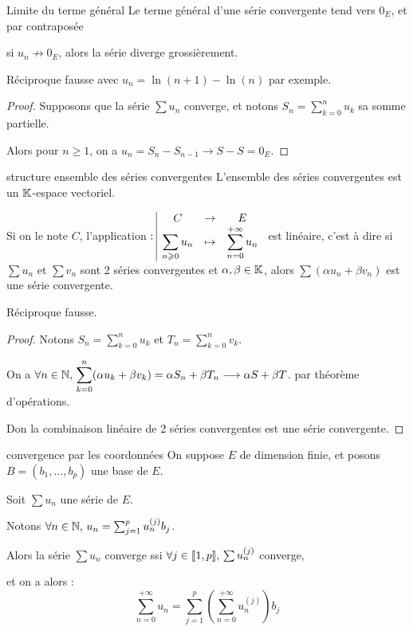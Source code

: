 \begin{theoreme}{Limite du terme général}{}
    Le terme général d'une série convergente tend vers $0_E$, et par contraposée 
    
    si $u_n \not \longrightarrow 0_E$, alors la série diverge grossièrement. 
\end{theoreme}

\begin{remarque}
    Réciproque fausse avec $u_n = \ln(n + 1) - \ln(n)$ par exemple. 
\end{remarque}


\begin{proof}
    Supposons que la série $\sum u_n$ converge, et notons $\displaystyle S_n = \sum_{k=0}^n u_k$ sa somme partielle.

    Alors pour $n \geqslant 1$, on a $u_n = S_n - S_{n-1} \longrightarrow S - S = 0_E$.
\end{proof}

\begin{proposition}{structure ensemble des séries convergentes}{}
    L'ensemble des séries convergentes est un $\mathbb{K}$-espace vectoriel.

    Si on le note $C$, l'application $: \space \begin{array}{|ccc} \displaystyle C & \to & \displaystyle E \\ \displaystyle \sum_{n \geqslant 0} u_n & \mapsto & \displaystyle \sum_{n = 0}^{+\infty} u_n \end{array}$ 
    est linéaire, c'est à dire si $\sum u_n$ et $\sum v_n$ sont 2 séries convergentes et
    $\alpha, \beta \in \mathbb{K}$, alors $\sum (\alpha u_n + \beta v_n)$ est une série convergente.
\end{proposition}

\begin{remarque}
    Réciproque fausse.
\end{remarque}

\begin{proof}
    Notons $S_n = \displaystyle \sum_{k=0}^n u_k$ et $T_n = \displaystyle \sum_{k=0}^n v_k$.

    On a $\displaystyle \forall n \in \mathbb{N}, \, \sum_{k=0}^n (\alpha u_k + \beta v_k) = \alpha S_n + \beta T_n \longrightarrow \alpha S + \beta T$.
    par théorème d'opérations. 

    Don la combinaison linéaire de 2 séries convergentes est une série convergente.
\end{proof}


\begin{proposition}{convergence par les coordonnées}{}
    On suppose $E$ de dimension finie, et posons $B = (b_1, \ldots, b_p)$ une base de $E$.

    Soit $\sum u_n$ une série de $E$. 

    Notons $\forall n \in \mathbb{N}, \, u_n = \sum_{j = 1 }^p u_n^{(j)} b_j$. 

    Alors la série $\sum u_n$ converge ssi $\forall j \in [\![1, p]\!], \, \sum u_n^{(j)}$ converge, 

    et on a alors :
    $$\sum_{n = 0}^{+\infty} u_n = \sum_{j = 1}^p \left( \sum_{n = 0}^{+\infty} u_n^{(j)} \right) b_j$$
\end{proposition}

